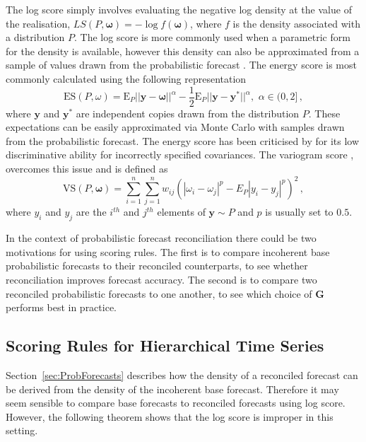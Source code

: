 \documentclass[12pt]{article}
\def\E{\text{E}}
\theoremstyle{definition}
\begin{document}
The log score simply involves evaluating the negative log density at the value of the realisation, $LS(P,\bm\omega)=-\log f(\bm\omega)$, where $f$ is the density associated with a distribution $P$.  The log score is more commonly used when a parametric form for the density is available, however  this density can also be approximated from a sample of values drawn from the probabilistic forecast \citep[see][]{Jordan2017}.  The energy score is most commonly calculated using the following representation
\begin{equation}\label{eq:Energy_score}
\text{ES}(P,\omega) =
\E_{P}
||{\bm{y}}-\bm{\omega}||^\alpha -\frac{1}{2}\E_{P}||\bm{y}-\bm{y}^*||^\alpha, \,\, \alpha \in (0,2]\,,
\end{equation}
where $\bm {y}$ and $\bm{y^*}$ are independent copies drawn from the distribution $P$.  These expectations can be easily approximated via Monte Carlo with samples drawn from the probabilistic forecast.  %
The energy score has been criticised by \citet{Pinson2013a} for its low discriminative ability for incorrectly specified covariances.  The variogram score  \citep{SCHEUERER2015}, overcomes this issue and is defined as
\begin{equation}
\text{VS}({P}, \bm{\omega}) = \displaystyle\sum_{i=1}^{n}\displaystyle\sum_{j=1}^{n}w_{ij}\left(|\omega_{i} - \omega_{j}|^p - E_{P} |{y}_{i}-{y}_{j}|^p\right)^2\,,
\end{equation}
where $y_i$ and $y_j$ are the $i^{th}$ and $j^{th}$ elements of $\bm{y}\sim P$ and $p$ is usually set to $0.5$.

In the context of probabilistic forecast reconciliation there could be two motivations for using scoring rules. The first is to compare incoherent base probabilistic forecasts to their reconciled counterparts, to see whether reconciliation improves forecast accuracy. The second is to compare two reconciled probabilistic forecasts to one another, to see which choice of $\bm{G}$ performs best in practice.  

\subsection{Scoring Rules for Hierarchical Time Series}

Section~\ref{sec:ProbForecasts} describes how the density of a reconciled forecast can be derived from the density of the incoherent base forecast. Therefore it may seem sensible to compare base forecasts to reconciled forecasts using log score. However, the following theorem shows that the log score is improper in this setting.
\end{document}

